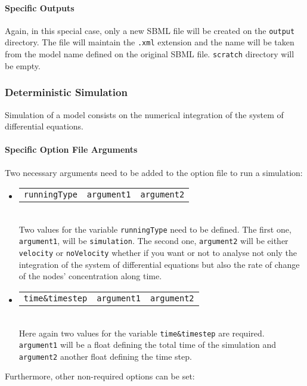 \documentclass[a4paper, 11pt]{article}
\begin{document}
\paragraph{Specific Outputs}
Again, in this special case, only a new SBML file will be created on the \texttt{output} directory.
The file will maintain the \texttt{.xml} extension and the name will be taken from the model name defined on the original SBML file.
\texttt{scratch} directory will be empty.
\subsubsection{Deterministic Simulation} \label{simulation}
Simulation of a model consists on the numerical integration of the system of differential equations.
\paragraph{Specific Option File Arguments} \label{simulationFileArguments}
Two necessary arguments need to be added to the option file to run a simulation:
\begin{itemize}
\item \begin{tabular}{ccc}\texttt{runningType}&\texttt{argument1}&\texttt{argument2}\end{tabular}\\[1.5ex]
  Two values for the variable \texttt{runningType} need to be defined. 
  The first one, \texttt{argument1}, will be \texttt{simulation}.
  The second one, \texttt{argument2} will be either \texttt{velocity} or \texttt{noVelocity} whether if you want or not to analyse not only the integration of the system of differential equations but also the rate of change of the nodes' concentration along time.
\item \begin{tabular}{ccc}\texttt{time\&timestep}&\texttt{argument1}&\texttt{argument2}\end{tabular}\\[1.5ex]
  Here again two values for the variable \texttt{time\&timestep} are required.
  \texttt{argument1} will be a float defining the total time of the simulation and \texttt{argument2} another float defining the time step.
\end{itemize}
Furthermore, other non-required options can be set:
\end{document}
